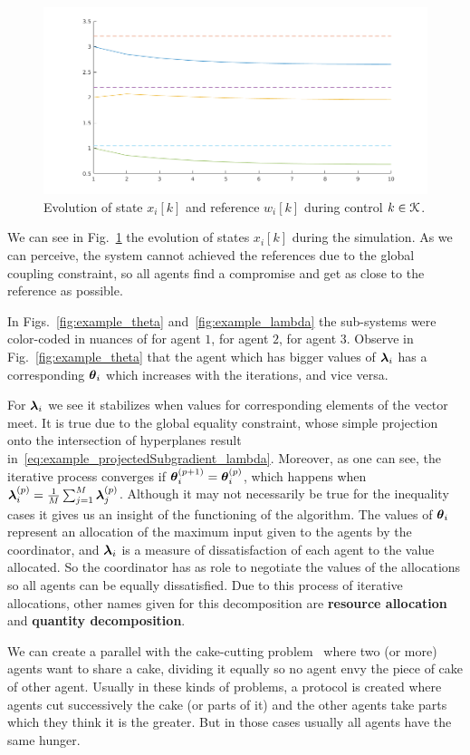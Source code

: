 \documentclass[../main.tex]{subfiles}
\begin{document}
\begin{figure}[h]
  \centering
  \includegraphics[width=.5\textwidth]{../img/example_state.png}
  \caption{Evolution of state $x_{i}[k]$ and reference $w_{i}[k]$ during control ${k\in\mathcal{K}}$. }\label{fig:example_state}
\end{figure}
We can see in Fig.~\ref{fig:example_state} the evolution of states $x_{i}[k]$ during the simulation.
As we can perceive, the system cannot achieved the references due to the global coupling constraint, so all agents find a compromise and get as close to the reference as possible.

In Figs.~\ref{fig:example_theta} and~\ref{fig:example_lambda} the sub-systems were color-coded in nuances of  for agent $1$,  for agent $2$,  for agent $3$.
Observe in Fig.~\ref{fig:example_theta} that the agent which has bigger values of $\boldsymbol{\lambda}_i$ has a corresponding $\boldsymbol{\theta}_i$ which increases with the iterations, and vice versa.

For $\boldsymbol{\lambda}_i$ we see it stabilizes when values for corresponding elements of the vector meet.
It is true due to the global equality constraint, whose simple projection onto the intersection of hyperplanes result in~\eqref{eq:example_projectedSubgradient_lambda}.
Moreover, as one can see, the iterative process converges if ${\boldsymbol{\theta}_i^{(p+1)}=\boldsymbol{\theta}_i^{(p)}}$, which happens when ${\boldsymbol{\lambda}_i^{(p)}=\frac{1}{M}\sum_{j=1}^{M}\boldsymbol{\lambda}_j^{(p)}}$.
Although it may not necessarily be true for the inequality cases it gives us an insight of the functioning of the algorithm.
The values of $\boldsymbol{\theta}_i$ represent an allocation of the maximum input given to the agents by the coordinator, and $\boldsymbol{\lambda}_i$ is a measure of dissatisfaction of each agent to the value allocated.
So the coordinator has as role to negotiate the values of the allocations so all agents can be equally dissatisfied.
Due to this process of iterative allocations, other names given for this decomposition are \textbf{resource allocation} and \textbf{quantity decomposition}.

We can create a parallel with the cake-cutting problem~\cite{BramsTaylor1995} where two (or more) agents want to share a cake, dividing it equally so no agent envy the piece of cake of other agent.
Usually in these kinds of problems, a protocol is created where agents cut successively the cake (or parts of it) and the other agents take parts which they think it is the greater.
But in those cases usually all agents have the same hunger.
\end{document}

